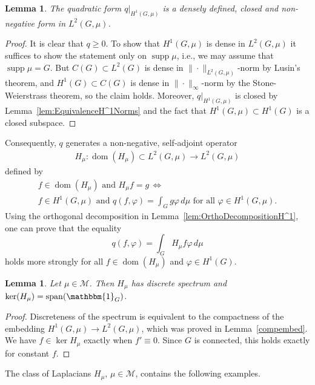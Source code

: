 \documentclass[reqno]{amsart}
\theoremstyle{plain}
\newtheorem{lem}[thm]{Lemma}
\theoremstyle{definition}
\theoremstyle{remark}
\numberwithin{equation}{section}
\newcommand{\cM}{\mathcal{M}}
\newcommand{\supp}{\operatorname{supp}}
\newcommand{\dom}{\operatorname{dom}}
\newcommand{\Span}{\operatorname{span}}
\begin{document}
	\begin{lem} The quadratic form $q\big|_{H^1(G, \mu)}$ is a densely defined, closed and non-negative form in $L^2(G,\mu)$.
	\end{lem}
	\begin{proof}
	It is clear that $q\geq 0$. To show that $H^1(G, \mu)$ is dense in $L^2(G, \mu)$ it suffices to show the statement only on $\supp \mu$, i.e., we may assume that $\supp \mu =G$. But $C(G) \subset L^2(G)$ is dense in $\|\cdot\|_{L^2(G,\mu)}$-norm by Lusin's theorem, and $H^1(G) \subset C(G)$ is dense in $\|\cdot\|_{\infty}$-norm by the Stone-Weierstrass theorem, so the claim holds. Moreover, $q\big|_{H^1(G, \mu)}$ is closed by Lemma~\ref{lem:EquivalenceH^1Norms} and the fact that $H^1(G, \mu) \subset H^1(G)$ is a closed subspace. 
	\end{proof}
Consequently, $q$ generates a non-negative, self-adjoint operator
\begin{align*}
		H_\mu\colon \dom(H_\mu) \subset L^2(G, \mu) \longrightarrow L^2(G, \mu)
\end{align*}
defined by
\begin{gather*}
	f \in \dom(H_\mu) \text{ and } H_\mu f = g \, \Leftrightarrow \\ f \in H^1(G, \mu) \text{ and } q(f,\varphi) = \int_G g \varphi \, d\mu \text{ for all } \varphi \in H^1(G, \mu).
\end{gather*}
Using the orthogonal decomposition in Lemma~\ref{lem:OrthoDecompositionH^1}, one can prove that the equality
\begin{equation} \label{eq:RepresentationTheorem}
q(f,\varphi) = \int_G H_\mu f \varphi \, d\mu
\end{equation}
holds more strongly for all $f \in\dom(H_\mu)$ and $\varphi \in H^1(G)$. 

	\begin{lem}\label{lem:BasicsSpecHmu}
		Let  $\mu\in \cM$. Then $H_\mu$ has discrete spectrum and $\ker(H_\mu) =\Span(\mathbbm{1}_G)$.
	\end{lem}
	\begin{proof}
		Discreteness of the spectrum is equivalent to the compactness of the embedding $H^1(G, \mu) \to L^2(G, \mu)$, which was proved in Lemma~\ref{compembed}. We have $f \in \ker H_\mu$ exactly when $f'\equiv 0$. Since $G$ is connected, this holds exactly for constant $f$. 
	\end{proof}

The class of Laplacians $H_\mu$, $\mu \in \cM$, contains the following examples.
\end{document}
